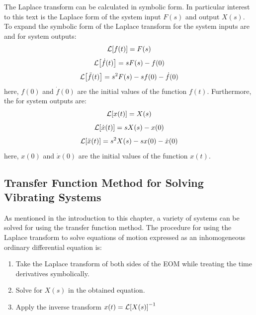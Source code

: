 \documentclass[12pt,letter]{article}
\begin{document}
\begin{review}
			The Laplace transform can be calculated in symbolic form. In particular interest to this text is the Laplace form of the system input $F(s)$ and output $X(s)$. To expand the symbolic form of the Laplace transform for the system inputs are 
			and for system outputs:
			\begin{equation}
				\label{eq:laplace_f}
				\mathcal{L}{\left[f(t)\right]} = F(s)
			\end{equation}		
			\begin{equation}
				\label{eq:laplace_f'}
				\mathcal{L}{\left[\dot{f}(t)\right]} = sF(s)-f(0)
			\end{equation}	
			\begin{equation}
				\label{eq:laplace_f''}
				\mathcal{L}{\left[\ddot{f}(t)\right]} = s^2F(s)-sf(0) - \dot{f}(0)
			\end{equation}	
			here, $f(0)$ and $\dot{f}(0)$ are the initial values of the function $f(t)$.  Furthermore, the for system outputs are:
			\begin{equation}
				\label{eq:laplace_x}
				\mathcal{L}{\left[x(t)\right]} = X(s)
			\end{equation}		
			\begin{equation}
				\label{eq:laplace_x'}
				\mathcal{L}{\left[\dot{x}(t)\right]} = sX(s)-x(0)
			\end{equation}	
			\begin{equation}
				\label{eq:laplace_x''}
				\mathcal{L}{\left[\ddot{x}(t)\right]} = s^2X(s)-sx(0) - \dot{x}(0)
			\end{equation}	
			here, $x(0)$ and $\dot{x}(0)$ are the initial values of the function $x(t)$. 		
	
\end{review}


		\subsection{Transfer Function Method for Solving Vibrating Systems}
		
			As mentioned in the introduction to this chapter, a variety of systems can be solved for using the transfer function method. The procedure for using the Laplace transform to solve equations of motion expressed as an inhomogeneous ordinary differential equation is:
			\begin{enumerate}
				\item Take the Laplace transform of both sides of the EOM while treating the time derivatives symbolically.
				\item Solve for $X(s)$ in the obtained equation.
				\item Apply the inverse transform $x(t) = \mathcal{L}{\left[X(s)\right]}^{-1}$
			\end{enumerate}
				
\end{document}
